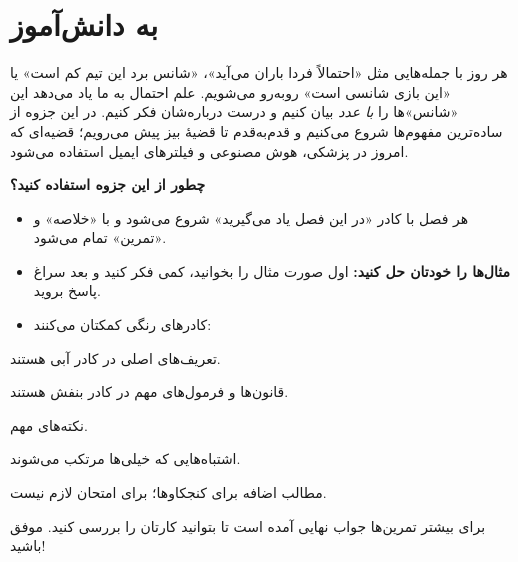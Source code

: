 \documentclass[a4paper,11pt,oneside,openany]{book}
\begin{document}
\frontmatter
\tableofcontents

\chapter*{به دانش‌آموز}

هر روز با جمله‌هایی مثل «احتمالاً فردا باران می‌آید»، «شانس برد این تیم کم است» یا «این بازی شانسی است» روبه‌رو می‌شویم. علم احتمال به ما یاد می‌دهد این «شانس»ها را \emph{با عدد} بیان کنیم و درست درباره‌شان فکر کنیم. در این جزوه از ساده‌ترین مفهوم‌ها شروع می‌کنیم و قدم‌به‌قدم تا قضیهٔ بیز پیش می‌رویم؛ قضیه‌ای که امروز در پزشکی، هوش مصنوعی و فیلترهای ایمیل استفاده می‌شود.

\textbf{چطور از این جزوه استفاده کنید؟}
\begin{itemize}
  \item هر فصل با کادر «در این فصل یاد می‌گیرید» شروع می‌شود و با «خلاصه» و «تمرین» تمام می‌شود.
  \item \textbf{مثال‌ها را خودتان حل کنید:} اول صورت مثال را بخوانید، کمی فکر کنید و بعد سراغ پاسخ بروید.
  \item کادرهای رنگی کمکتان می‌کنند:
\end{itemize}

\begin{definition}[title={تعریف}]{}
تعریف‌های اصلی در کادر آبی هستند.
\end{definition}
\begin{theorem}[title={قانون}]{}
قانون‌ها و فرمول‌های مهم در کادر بنفش هستند.
\end{theorem}
\begin{note}نکته‌های مهم.\end{note}
\begin{warning}اشتباه‌هایی که خیلی‌ها مرتکب می‌شوند.\end{warning}
\begin{moreinfo}{}مطالب اضافه برای کنجکاوها؛ برای امتحان لازم نیست.\end{moreinfo}

برای بیشتر تمرین‌ها جواب نهایی آمده است تا بتوانید کارتان را بررسی کنید. موفق باشید!

\mainmatter






\end{document}
